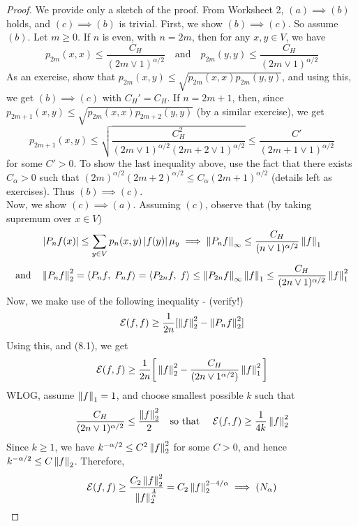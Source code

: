 \documentclass[main]{subfiles}
\begin{document}
\begin{proof}
We provide only a sketch of the proof. From Worksheet 2, $(a) \implies (b)$  holds, and $(c) \implies (b)$ is trivial. First, we show $(b) \implies (c)$. So assume $(b)$.
Let $m\ge0$. If $n$ is even, with $n=2m$, then for any $x,y\in V$, we have
\[p_{2m}(x,x)\le\frac{C_H}{(2m\lor 1)^{\alpha/2}}\quad\text{and}\quad p_{2m}(y,y)\le\frac{C_H}{(2m\lor 1)^{\alpha/2}}\]
As an exercise, show that $p_{2m}(x,y)\le\sqrt{p_{2m}(x,x)p_{2m}(y,y)}$, and using this, we get $(b) \implies (c)$ with $C_H'=C_H$. If $n=2m+1$, then, since $p_{2m+1}(x,y)\le\sqrt{p_{2m}(x,x)p_{2m+2}(y,y)}$ (by a similar exercise), we get \[p_{2m+1}(x,y)\le\sqrt{\frac{C_H^2}{(2m\lor 1)^{\alpha/2}(2m+2\lor 1)^{\alpha/2}}}\le \frac{C'}{(2m+1\lor 1)^{\alpha/2}}\] for some $C'>0$. To show the last inequality above, use the fact that there exists $C_{\alpha}>0$ such that $(2m)^{\alpha/2}(2m+2)^{\alpha/2}\le C_{\alpha}(2m+1)^{\alpha/2}$ (details left as exercises). Thus $(b)\implies (c)$.\\
Now, we show $(c)\implies (a)$. Assuming $(c)$, observe that (by taking supremum over $x\in V$) \[\left\lvert P_nf(x)\right\rvert \le \sum_{y\in V}p_n(x,y)\left\lvert f(y)\right\rvert\mu_y\implies \left\lVert P_nf\right\rVert_{\infty} \le \frac{C_H}{(n\lor 1)^{\alpha/2}}\left\lVert f\right\rVert_{1}\]
\begin{equation} \label{eq:1}
	\text{and\quad}\left\lVert P_nf\right\rVert_{2}^2=\left\langle P_nf,\;P_nf\right\rangle=\left\langle P_{2n}f,\;f\right\rangle\le\left\lVert P_{2n}f\right\rVert_{\infty}\left\lVert f\right\rVert_{1}\le \frac{C_H}{(2n\lor 1)^{\alpha/2}}\left\lVert f\right\rVert_{1}^2
\end{equation}
Now, we make use of the following inequality - (verify!)
\[\mathcal E(f, f)\ge \frac{1}{2n}[\left\lVert f\right\rVert_{2}^2-\left\lVert P_nf\right\rVert_{2}^2]\]
Using this, and (8.1), we get
\[\mathcal E(f,f) \ge \frac{1}{2n}\bigg[\left\lVert f\right\rVert_{2}^2-\frac{C_H}{(2n\lor 1^{\alpha/2})}\left\lVert f\right\rVert_{1}^2\bigg]\]
WLOG, assume $\left\lVert f\right\rVert_{1}=1$, and choose smallest possible $k$ such that
\[\frac{C_H}{(2n\lor 1)^{\alpha/2}}\le\frac{\left\lVert f\right\rVert_{2}^2}{2}\text{\quad so that \quad}\mathcal E(f,f)\ge\frac{1}{4k}\left\lVert f\right\rVert_{2}^2\]
Since $k\ge 1$, we have $k^{-\alpha/2}\le C^2\left\lVert f\right\rVert_{2}^2$ for some $C>0$, and hence $k^{-\alpha/2}\le C\left\lVert f\right\rVert_{2}$. Therefore,
\[\mathcal E(f,f)\ge \frac{C_2\left\lVert f\right\rVert_{2}^2}{\left\lVert f\right\rVert_{2}^{\frac{4}{\alpha}}} = C_2\left\lVert f\right\rVert_{2}^{2-4/\alpha}\implies (N_{\alpha})\]
\end{proof}
\end{document}
